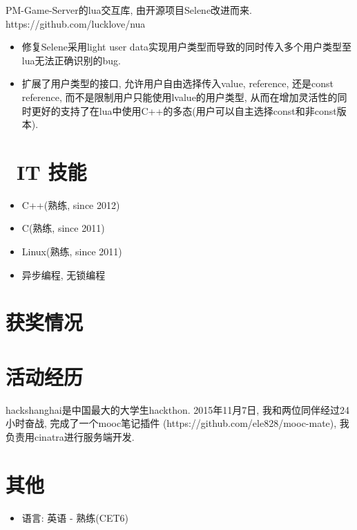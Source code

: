 \documentclass{resume}
\begin{document}
\begin{onehalfspacing}
PM-Game-Server的lua交互库, 由开源项目Selene改进而来.
\newline
https://github.com/lucklove/nua
\begin{itemize}
  \item 修复Selene采用light user data实现用户类型而导致的同时传入多个用户类型至lua无法正确识别的bug.
  \item 扩展了用户类型的接口, 允许用户自由选择传入value, reference, 还是const reference, 而不是限制用户只能使用lvalue的用户类型, 从而在增加灵活性的同时更好的支持了在lua中使用C++的多态(用户可以自主选择const和非const版本).
\end{itemize}
\end{onehalfspacing}



\section{\faCogs\ IT 技能}
\begin{itemize}[parsep=0.5ex]
  \item C++(熟练, since 2012)
  \item C(熟练, since 2011)
  \item Linux(熟练, since 2011)
  \item 异步编程, 无锁编程
\end{itemize}

\section{\faHeartO 获奖情况}

\section{\faUsers 活动经历}
hackshanghai是中国最大的大学生hackthon. 
2015年11月7日, 我和两位同伴经过24小时奋战, 
完成了一个mooc笔记插件
(https://github.com/ele828/mooc-mate),
我负责用cinatra进行服务端开发. 

\section{\faInfo 其他}
\begin{itemize}[parsep=0.5ex]
  \item 语言: 英语 - 熟练(CET6)
\end{itemize}

%
%
\end{document}
